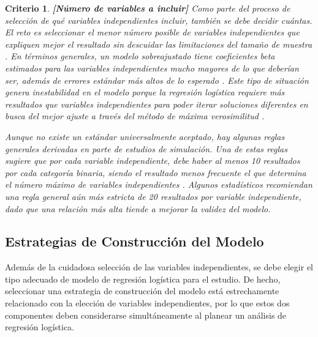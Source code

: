 \documentclass[12pt]{article}
\newtheorem{Criterio}{Criterio}%
\begin{document}
\begin{Criterio} \textbf{[N\'umero de variables a incluir]} Como parte del proceso de selecci\'on de qu\'e variables independientes incluir, tambi\'en se debe decidir cu\'antas. El reto es seleccionar el menor n\'umero posible de variables independientes que expliquen mejor el resultado sin descuidar las limitaciones del tama\~no de muestra \cite{tabachnick2007,hosmer2000}. En t\'erminos generales, un modelo sobreajustado tiene coeficientes beta estimados para las variables independientes mucho mayores de lo que deber\'ian ser, adem\'as de errores est\'andar m\'as altos de lo esperado \cite{hosmer2000}. Este tipo de situaci\'on genera inestabilidad en el modelo porque la regresi\'on log\'istica requiere m\'as resultados que variables independientes para poder iterar soluciones diferentes en busca del mejor ajuste a trav\'es del m\'etodo de m\'axima verosimilitud \cite{tabachnick2007,hosmer2000}.

Aunque no existe un est\'andar universalmente aceptado, hay algunas \textit{reglas generales} derivadas en parte de estudios de simulaci\'on. Una de estas reglas sugiere que por cada variable independiente, debe haber al menos 10 resultados por cada categor\'ia binaria, siendo el resultado menos frecuente el que determina el n\'umero m\'aximo de variables independientes \cite{peduzzi1996, agresti2007}. Algunos estad\'isticos recomiendan una \textit{regla general} a\'un m\'as estricta de 20 resultados por variable independiente, dado que una relaci\'on m\'as alta tiende a mejorar la validez del modelo\cite{feinstein1996}. 
\end{Criterio}


\subsection{Estrategias de Construcci\'on del Modelo}

Adem\'as de la cuidadosa selecci\'on de las variables independientes, se debe elegir el tipo adecuado de modelo de regresi\'on log\'istica para el estudio. De hecho, seleccionar una estrategia de construcci\'on del modelo est\'a estrechamente relacionado con la elecci\'on de variables independientes, por lo que estos dos componentes deben considerarse simult\'aneamente al planear un an\'alisis de regresi\'on log\'istica.
\end{document}
